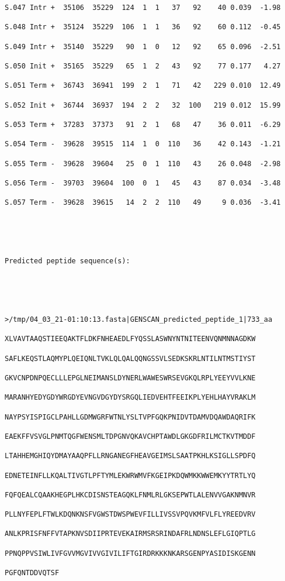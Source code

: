 \documentclass[en,black,10pt,normal]{elegantnote}
\begin{document}
\begin{lstlisting}[frame=single]
S.047 Intr +  35106  35229  124  1  1   37   92    40 0.039  -1.98

S.048 Intr +  35124  35229  106  1  1   36   92    60 0.112  -0.45

S.049 Intr +  35140  35229   90  1  0   12   92    65 0.096  -2.51

S.050 Init +  35165  35229   65  1  2   43   92    77 0.177   4.27

S.051 Term +  36743  36941  199  2  1   71   42   229 0.010  12.49

S.052 Init +  36744  36937  194  2  2   32  100   219 0.012  15.99

S.053 Term +  37283  37373   91  2  1   68   47    36 0.011  -6.29

S.054 Term -  39628  39515  114  1  0  110   36    42 0.143  -1.21

S.055 Term -  39628  39604   25  0  1  110   43    26 0.048  -2.98

S.056 Term -  39703  39604  100  0  1   45   43    87 0.034  -3.48

S.057 Term -  39628  39615   14  2  2  110   49     9 0.036  -3.41





Predicted peptide sequence(s):





>/tmp/04_03_21-01:10:13.fasta|GENSCAN_predicted_peptide_1|733_aa

XLVAVTAAQSTIEEQAKTFLDKFNHEAEDLFYQSSLASWNYNTNITEENVQNMNNAGDKW

SAFLKEQSTLAQMYPLQEIQNLTVKLQLQALQQNGSSVLSEDKSKRLNTILNTMSTIYST

GKVCNPDNPQECLLLEPGLNEIMANSLDYNERLWAWESWRSEVGKQLRPLYEEYVVLKNE

MARANHYEDYGDYWRGDYEVNGVDGYDYSRGQLIEDVEHTFEEIKPLYEHLHAYVRAKLM

NAYPSYISPIGCLPAHLLGDMWGRFWTNLYSLTVPFGQKPNIDVTDAMVDQAWDAQRIFK

EAEKFFVSVGLPNMTQGFWENSMLTDPGNVQKAVCHPTAWDLGKGDFRILMCTKVTMDDF

LTAHHEMGHIQYDMAYAAQPFLLRNGANEGFHEAVGEIMSLSAATPKHLKSIGLLSPDFQ

EDNETEINFLLKQALTIVGTLPFTYMLEKWRWMVFKGEIPKDQWMKKWWEMKYYTRTLYQ

FQFQEALCQAAKHEGPLHKCDISNSTEAGQKLFNMLRLGKSEPWTLALENVVGAKNMNVR

PLLNYFEPLFTWLKDQNKNSFVGWSTDWSPWEVFILLIVSSVPQVKMFVLFLYREEDVRV

ANLKPRISFNFFVTAPKNVSDIIPRTEVEKAIRMSRSRINDAFRLNDNSLEFLGIQPTLG

PPNQPPVSIWLIVFGVVMGVIVVGIVILIFTGIRDRKKKNKARSGENPYASIDISKGENN

PGFQNTDDVQTSF

\end{lstlisting}
\end{document}
